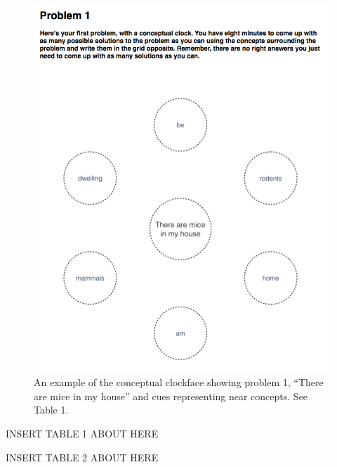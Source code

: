 \documentclass[english,man]{apa6}
\begin{document}
\begin{figure}
\hypertarget{fig:clockface}{%
\centering
\includegraphics{conceptClockExample.jpg}
\caption{An example of the conceptual clockface showing problem 1,
\enquote{There are mice in my house} and cues representing near
concepts. See Table 1.}\label{fig:clockface}
}
\end{figure}

INSERT TABLE 1 ABOUT HERE

INSERT TABLE 2 ABOUT HERE
\end{document}
